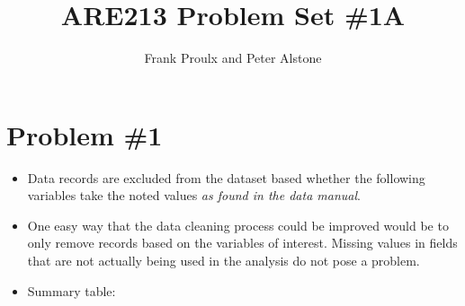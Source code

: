 \documentclass[a4paper, 12pt]{article}
\begin{document}
\title{ARE213 Problem Set \#1A}
\author{Frank Proulx and Peter Alstone}
\maketitle

\section{Problem \#1}

\begin{itemize}
\item Data records are excluded from the dataset based whether the following variables take the noted values \textit{as found in the data manual}. %

\item One easy way that the data cleaning process could be improved would be to only remove records based on the variables of interest. Missing values in fields that are not actually being used in the analysis do not pose a problem.


\item Summary table:
\end{itemize}
\end{document}
